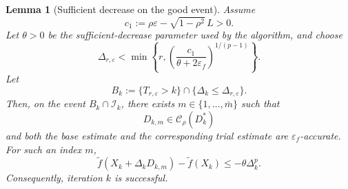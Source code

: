 \documentclass[11pt,a4paper]{article}
\newtheorem{lemma}{Lemma}[section]
\newcommand{\Dexp}{p}
\newcommand{\goldelta}{r}
\newcommand{\sara}[1]{{\color{red}{\textbf{[SS: #1]}}\color{black}}}
\begin{document}
\begin{lemma}[Sufficient decrease on the good event]
\label{lem:good-event-sufficient-decrease}
Assume
\[
   c_1
   :=
   \rho\varepsilon-\sqrt{1-\rho^{2}}\,L
   >
   0 .
\]
Let \(\theta>0\) be the sufficient-decrease parameter used by the algorithm, and
choose
\[
  \Delta_{\goldelta,\varepsilon}
  <
  \min\left\{
      \goldelta,
      \left(
          \frac{c_1}{\theta+2\varepsilon_f}
      \right)^{1/(\Dexp-1)}
  \right\}.
\]
Let
\[
    B_k
    :=
    \{T_{\goldelta,\varepsilon}>k\}
    \cap
    \{\Delta_k\le\Delta_{\goldelta,\varepsilon}\}.
\]
Then, on the event \(B_k\cap\mathcal I_k\), there exists
\(m\in\{1,\ldots,\bar m\}\) such that
\[
    D_{k,m}\in\mathcal C_\rho(D_k^*)
\]
and both the base estimate and the corresponding trial estimate are
\(\varepsilon_f\)-accurate. For such an index \(m\),
\[
    \tilde f(X_k+\Delta_kD_{k,m})
    -
    \tilde f(X_k)
    \le
    -\theta\Delta_k^{\Dexp}.
\]
Consequently, iteration \(k\) is successful.
\end{lemma}
\end{document}

